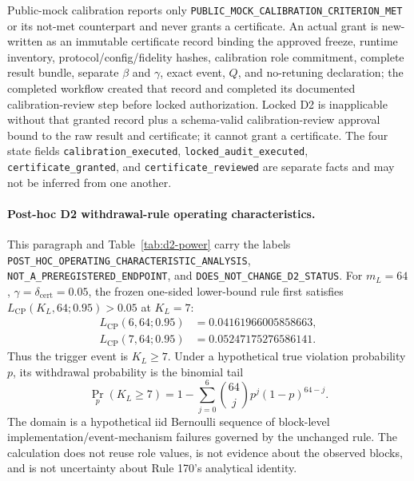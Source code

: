 Public-mock calibration reports only
\texttt{PUBLIC\_MOCK\_CALIBRATION\_CRITERION\_MET} or its not-met counterpart and never grants a
certificate. An actual grant is new-written as an immutable certificate record binding the
approved freeze, runtime inventory, protocol/config/fidelity hashes, calibration role commitment,
complete result bundle, separate \(\beta\) and \(\gamma\), exact event, \(Q\), and no-retuning
declaration; the completed workflow created that record and completed its documented calibration-review
step before locked authorization. Locked D2 is inapplicable without that granted record plus a
schema-valid calibration-review approval bound to the raw result and certificate; it cannot grant a certificate. The four
state fields \texttt{calibration\_executed}, \texttt{locked\_audit\_executed},
\texttt{certificate\_granted}, and \texttt{certificate\_reviewed} are separate facts and may not
be inferred from one another.

\paragraph{Post-hoc D2 withdrawal-rule operating characteristics.}
This paragraph and Table~\ref{tab:d2-power} carry the labels
\nolinkurl{POST_HOC_OPERATING_CHARACTERISTIC_ANALYSIS},
\nolinkurl{NOT_A_PREREGISTERED_ENDPOINT}, and
\nolinkurl{DOES_NOT_CHANGE_D2_STATUS}. For \(m_L=64\),
\(\gamma=\delta_{\mathrm{cert}}=0.05\), the frozen one-sided lower-bound rule first satisfies
\(L_{\mathrm{CP}}(K_L,64;0.95)>0.05\) at \(K_L=7\):
\[
\begin{aligned}
L_{\mathrm{CP}}(6,64;0.95)&=0.04161966005858663,\\
L_{\mathrm{CP}}(7,64;0.95)&=0.05247175276586141.
\end{aligned}
\]
Thus the trigger event is \(K_L\ge7\). Under a hypothetical true violation probability \(p\),
its withdrawal probability is the binomial tail
\[
\Pr_p(K_L\ge7)=1-\sum_{j=0}^{6}{64\choose j}p^j(1-p)^{64-j}.
\]
The domain is a hypothetical iid Bernoulli sequence of block-level implementation/event-mechanism
failures governed by the unchanged rule. The calculation does not reuse role values, is not
evidence about the observed blocks, and is not uncertainty about Rule 170's analytical identity.

